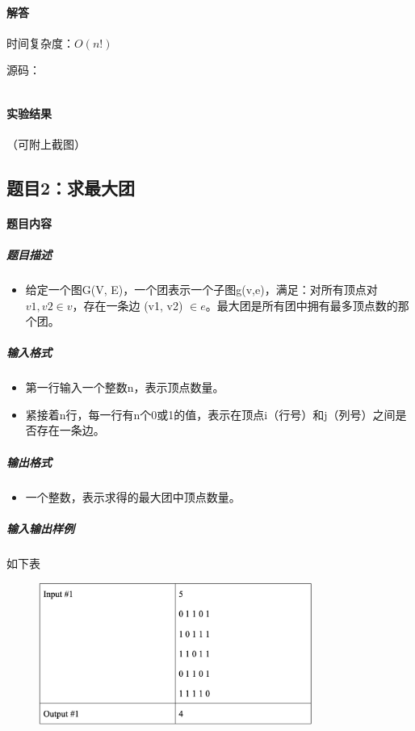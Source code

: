 \documentclass[12pt,a4paper]{ctexart}
\begin{document}
\vspace{5pt}

\paragraph{解答} 时间复杂度：$O(n!)$

源码：
\inputminted[bgcolor=codebg,frame=lines,autogobble,linenos=true,breaklines]{cpp}{src/a.cpp}

\vspace{5pt}

\paragraph{实验结果}
（可附上截图）

\newpage

\subsection*{题目2：求最大团}
\paragraph{题目内容}
\subparagraph{题目描述}
\begin{itemize}
    \item 给定一个图G(V, E)，一个团表示一个子图g(v,e)，满足：对所有顶点对$v1, v2 \in v$，存在一条边 (v1, v2) $ \in e$。最大团是所有团中拥有最多顶点数的那个团。
\end{itemize}

\subparagraph{输入格式}
    \begin{itemize}
        \item 第一行输入一个整数n，表示顶点数量。
        \item 紧接着n行，每一行有n个0或1的值，表示在顶点i（行号）和j（列号）之间是否存在一条边。
    \end{itemize}

\subparagraph{输出格式}
    \begin{itemize}
        \item 一个整数，表示求得的最大团中顶点数量。
    \end{itemize}
    
\subparagraph{输入输出样例}
如下表
    \begin{figure}[h]
        \centering
        \includegraphics[width=0.80\textwidth]{q2_iodata.png}
    \end{figure}
\end{document}

